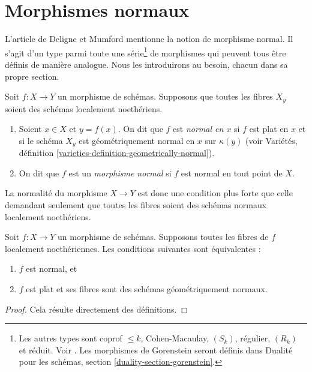 \section{Morphismes normaux}
\label{section-normal}

\noindent
L'article \cite{DM} de Deligne et Mumford mentionne la notion de morphisme
normal. Il s'agit d'un type parmi toute une série\footnote{
Les autres types sont coprof $\leq k$, Cohen-Macaulay, $(S_k)$,
régulier, $(R_k)$ et réduit. Voir \cite[IV, définition 6.8.1.]{EGA}.
Les morphismes de Gorenstein seront définis dans
Dualité pour les schémas, section \ref{duality-section-gorenstein}.}
de morphismes qui peuvent tous être définis de manière analogue. Nous les
introduirons au besoin, chacun dans sa propre section.

\begin{definition}
\label{definition-normal}
Soit $f : X \to Y$ un morphisme de schémas.
Supposons que toutes les fibres $X_y$ soient des schémas localement noethériens.
\begin{enumerate}
\item Soient $x \in X$ et $y = f(x)$. On dit que $f$ est {\it normal en $x$}
si $f$ est plat en $x$ et si le schéma $X_y$ est géométriquement
normal en $x$ sur $\kappa(y)$ (voir
Variétés, définition \ref{varieties-definition-geometrically-normal}).
\item On dit que $f$ est un {\it morphisme normal} si $f$ est normal
en tout point de $X$.
\end{enumerate}
\end{definition}

\noindent
La normalité du morphisme $X \to Y$ est donc une condition
plus forte que celle demandant seulement que toutes les
fibres soient des schémas normaux localement noethériens.

\begin{lemma}
\label{lemma-normal}
Soit $f : X \to Y$ un morphisme de schémas.
Supposons toutes les fibres de $f$ localement noethériennes.
Les conditions suivantes sont équivalentes :
\begin{enumerate}
\item $f$ est normal, et
\item $f$ est plat et ses fibres sont des schémas géométriquement normaux.
\end{enumerate}
\end{lemma}

\begin{proof}
Cela résulte directement des définitions.
\end{proof}

